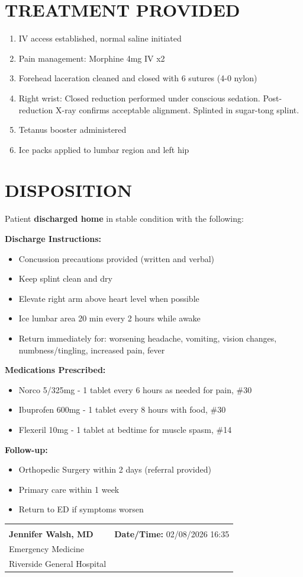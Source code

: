 \documentclass[11pt]{article}
\begin{document}
\section*{TREATMENT PROVIDED}

\begin{enumerate}
\item IV access established, normal saline initiated
\item Pain management: Morphine 4mg IV x2
\item Forehead laceration cleaned and closed with 6 sutures (4-0 nylon)
\item Right wrist: Closed reduction performed under conscious sedation. Post-reduction X-ray confirms acceptable alignment. Splinted in sugar-tong splint.
\item Tetanus booster administered
\item Ice packs applied to lumbar region and left hip
\end{enumerate}

\section*{DISPOSITION}

Patient \textbf{discharged home} in stable condition with the following:

\textbf{Discharge Instructions:}
\begin{itemize}[nosep]
\item Concussion precautions provided (written and verbal)
\item Keep splint clean and dry
\item Elevate right arm above heart level when possible
\item Ice lumbar area 20 min every 2 hours while awake
\item Return immediately for: worsening headache, vomiting, vision changes, numbness/tingling, increased pain, fever
\end{itemize}

\textbf{Medications Prescribed:}
\begin{itemize}[nosep]
\item Norco 5/325mg - 1 tablet every 6 hours as needed for pain, \#30
\item Ibuprofen 600mg - 1 tablet every 8 hours with food, \#30
\item Flexeril 10mg - 1 tablet at bedtime for muscle spasm, \#14
\end{itemize}

\textbf{Follow-up:}
\begin{itemize}[nosep]
\item Orthopedic Surgery within 2 days (referral provided)
\item Primary care within 1 week
\item Return to ED if symptoms worsen
\end{itemize}

\vspace{1.5em}

\begin{tabular}{@{}p{7cm}p{7cm}@{}}
\hrulefill & \\
\textbf{Jennifer Walsh, MD} & \textbf{Date/Time:} 02/08/2026 16:35 \\
Emergency Medicine & \\
Riverside General Hospital & \\
\end{tabular}
\end{document}
